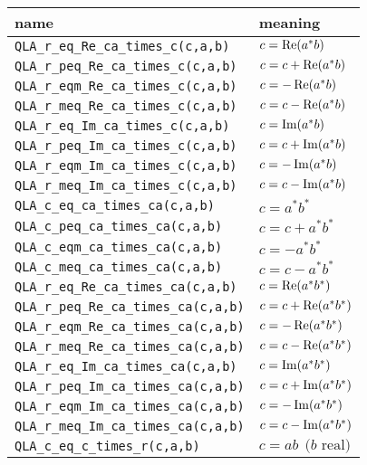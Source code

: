\documentclass{article}
\renewcommand{\Re}{\mathop{\rm Re}}
\renewcommand{\Im}{\mathop{\rm Im}}
\begin{document}
\begin{center}
\begin{tabular}{|l|l|}
\hline
  name           & meaning      \\
\hline
\verb|QLA_r_eq_Re_ca_times_c(c,a,b) | & $ c = \Re(a^*b)                   $ \\
\verb|QLA_r_peq_Re_ca_times_c(c,a,b)| & $ c = c +  \Re(a^*b)              $ \\
\verb|QLA_r_eqm_Re_ca_times_c(c,a,b)| & $ c = -\Re(a^*b)                  $ \\
\verb|QLA_r_meq_Re_ca_times_c(c,a,b)| & $ c = c -  \Re(a^*b)              $ \\
\verb|QLA_r_eq_Im_ca_times_c(c,a,b) | & $ c = \Im(a^*b)                   $ \\
\verb|QLA_r_peq_Im_ca_times_c(c,a,b)| & $ c = c +  \Im(a^*b)              $ \\
\verb|QLA_r_eqm_Im_ca_times_c(c,a,b)| & $ c = -\Im(a^*b)                  $ \\
\verb|QLA_r_meq_Im_ca_times_c(c,a,b)| & $ c = c -  \Im(a^*b)              $ \\
\verb|QLA_c_eq_ca_times_ca(c,a,b)   | & $ c = a^*b^*                      $ \\
\verb|QLA_c_peq_ca_times_ca(c,a,b)  | & $ c = c +  a^*b^*                 $ \\
\verb|QLA_c_eqm_ca_times_ca(c,a,b)  | & $ c = -a^*b^*                     $ \\
\verb|QLA_c_meq_ca_times_ca(c,a,b)  | & $ c = c -  a^*b^*                 $ \\
\verb|QLA_r_eq_Re_ca_times_ca(c,a,b)| & $ c = \Re(a^*b^*)                 $ \\
\verb|QLA_r_peq_Re_ca_times_ca(c,a,b)|& $ c = c +  \Re(a^*b^*)            $ \\
\verb|QLA_r_eqm_Re_ca_times_ca(c,a,b)|& $ c = -\Re(a^*b^*)                $ \\
\verb|QLA_r_meq_Re_ca_times_ca(c,a,b)|& $ c = c - \Re(a^*b^*)             $ \\
\verb|QLA_r_eq_Im_ca_times_ca(c,a,b)| & $ c = \Im(a^*b^*)                 $ \\
\verb|QLA_r_peq_Im_ca_times_ca(c,a,b)|& $ c = c +  \Im(a^*b^*)            $ \\
\verb|QLA_r_eqm_Im_ca_times_ca(c,a,b)|& $ c = -\Im(a^*b^*)                $ \\
\verb|QLA_r_meq_Im_ca_times_ca(c,a,b)|& $ c = c - \Im(a^*b^*)             $ \\
\verb|QLA_c_eq_c_times_r(c,a,b)     | & $ c = ab \ \ \mbox{($b$ real)}    $ \\

\end{tabular}
\end{center}
\end{document}
